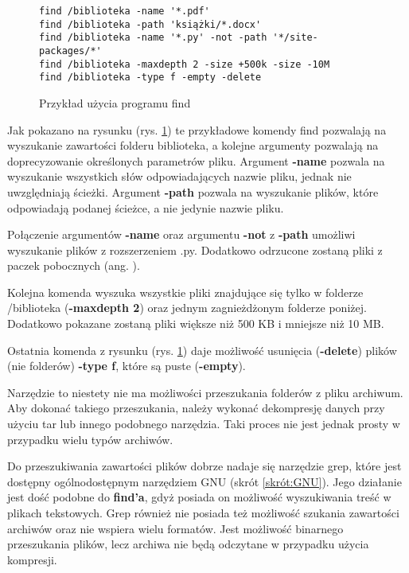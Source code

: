 \begin{figure}[htbp]
  \centering
\begin{tcolorbox}[
    colback=white,
    colframe=black,
    boxrule=0.5pt,
    arc=0pt
]
  \begin{verbatim}
find /biblioteka -name '*.pdf'
find /biblioteka -path 'książki/*.docx' 
find /biblioteka -name '*.py' -not -path '*/site-packages/*'  
find /biblioteka -maxdepth 2 -size +500k -size -10M           
find /biblioteka -type f -empty -delete 
  \end{verbatim}
\end{tcolorbox}
\caption{Przykład użycia programu find}
\label{fig:cmd:findExamples}
\end{figure}

Jak pokazano na rysunku (rys. \ref{fig:cmd:findExamples}) te przykładowe komendy find
pozwalają na wyszukanie zawartości folderu biblioteka, a kolejne argumenty 
pozwalają na doprecyzowanie określonych parametrów pliku. Argument \textbf{-name}
pozwala na wyszukanie wszystkich słów odpowiadających nazwie pliku, jednak nie
uwzględniają ścieżki. Argument \textbf{-path} pozwala na wyszukanie plików, 
które odpowiadają podanej ścieżce, a nie jedynie nazwie pliku.

Połączenie argumentów \textbf{-name} oraz argumentu \textbf{-not} z \textbf{-path}
umożliwi wyszukanie plików z rozszerzeniem .py. Dodatkowo odrzucone zostaną 
pliki z paczek pobocznych (ang. ).

Kolejna komenda wyszuka wszystkie pliki znajdujące się tylko w folderze 
/biblioteka (\textbf{-maxdepth 2}) oraz jednym zagnieżdżonym folderze poniżej.
Dodatkowo pokazane zostaną pliki większe niż 500 KB i mniejsze niż 10 MB.

Ostatnia komenda z rysunku (rys. \ref{fig:cmd:findExamples}) daje możliwość usunięcia 
(\textbf{-delete}) plików (nie folderów) \textbf{-type f}, które są puste (\textbf{-empty}).

Narzędzie to niestety nie ma możliwości przeszukania folderów z pliku
archiwum. Aby dokonać takiego przeszukania, należy wykonać dekompresję danych
przy użyciu tar lub innego podobnego narzędzia. Taki proces nie jest jednak 
prosty w przypadku wielu typów archiwów.

Do przeszukiwania zawartości plików dobrze nadaje się narzędzie grep, które jest
dostępny ogólnodostępnym narzędziem GNU (skrót \ref{skrót:GNU}). Jego działanie jest dość podobne do \textbf{find'a},
gdyż posiada on możliwość wyszukiwania treść w plikach tekstowych. Grep również nie 
posiada też możliwość szukania zawartości archiwów oraz nie wspiera wielu 
formatów. Jest możliwość binarnego przeszukania plików, lecz archiwa nie będą 
odczytane w przypadku użycia kompresji.

